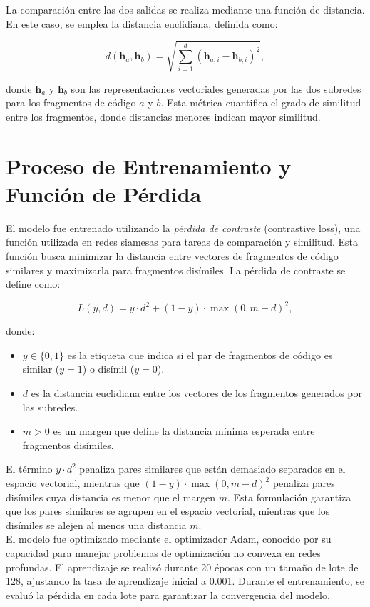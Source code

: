 La comparación entre las dos salidas se realiza mediante una función de distancia. En este caso, se emplea la distancia euclidiana, definida como:

\[
d(\mathbf{h}_a, \mathbf{h}_b) = \sqrt{\sum_{i=1}^{d} (\mathbf{h}_{a,i} - \mathbf{h}_{b,i})^2},
\]

donde \( \mathbf{h}_a \) y \( \mathbf{h}_b \) son las representaciones vectoriales generadas por las dos subredes para los fragmentos de código \( a \) y \( b \). Esta métrica cuantifica el grado de similitud entre los fragmentos, donde distancias menores indican mayor similitud.

\section{Proceso de Entrenamiento y Función de Pérdida}

El modelo fue entrenado utilizando la \textit{pérdida de contraste} (contrastive loss), una función utilizada en redes siamesas para tareas de comparación y similitud. Esta función busca minimizar la distancia entre vectores de fragmentos de código similares y maximizarla para fragmentos disímiles. La pérdida de contraste se define como:

\[
L(y, d) = y \cdot d^2 + (1 - y) \cdot \max(0, m - d)^2,
\]

donde:
\begin{itemize}
    \item \( y \in \{0, 1\} \) es la etiqueta que indica si el par de fragmentos de código es similar (\( y = 1 \)) o disímil (\( y = 0 \)).
    \item \( d \) es la distancia euclidiana entre los vectores de los fragmentos generados por las subredes.
    \item \( m > 0 \) es un margen que define la distancia mínima esperada entre fragmentos disímiles.
\end{itemize}

El término \( y \cdot d^2 \) penaliza pares similares que están demasiado separados en el espacio vectorial, mientras que \( (1 - y) \cdot \max(0, m - d)^2 \) penaliza pares disímiles cuya distancia es menor que el margen \( m \). Esta formulación garantiza que los pares similares se agrupen en el espacio vectorial, mientras que los disímiles se alejen al menos una distancia \( m \).\\

El modelo fue optimizado mediante el optimizador Adam, conocido por su capacidad para manejar problemas de optimización no convexa en redes profundas. El aprendizaje se realizó durante 20 épocas con un tamaño de lote de 128, ajustando la tasa de aprendizaje inicial a 0.001. Durante el entrenamiento, se evaluó la pérdida en cada lote para garantizar la convergencia del modelo.\\

